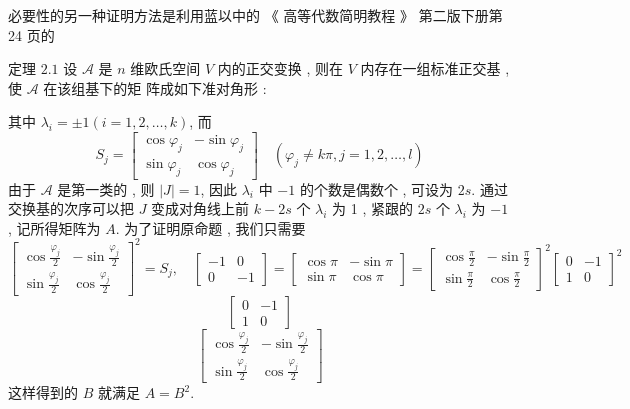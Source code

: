 \documentclass[10pt]{article}
\begin{document}
 必要性的另一种证明方法是利用蓝以中的 《 高等代数简明教程 》 第二版下册第  24  页的 

 定理  $2.1$  设  $\mathscr{A}$  是  $n$  维欧氏空间  $V$  内的正交变换 ,  则在  $V$  内存在一组标准正交基 ,  使  $\mathscr{A}$  在该组基下的矩   阵成如下准对角形 :


 其中  $\lambda_{i}=\pm 1(i=1,2, \ldots, k)$,  而 
$$
S_{j}=\left[\begin{array}{cc}
\cos \varphi_{j} & -\sin \varphi_{j} \\
\sin \varphi_{j} & \cos \varphi_{j}
\end{array}\right] \quad\left(\varphi_{j} \neq k \pi, j=1,2, \ldots, l\right)
$$
 由于  $\mathscr{A}$  是第一类的 ,  则  $|J|=1$,  因此  $\lambda_{i}$  中  $-1$  的个数是偶数个 ,  可设为  $2 s$.  通过交换基的次序可以把  $J$  变成对角线上前  $k-2 s$  个  $\lambda_{i}$  为  1 ,  紧跟的  $2 s$  个  $\lambda_{i}$  为  $-1$,  记所得矩阵为  $A$.  为了证明原命题 ,  我们只需要 
$$
\left[\begin{array}{cc}
\cos \frac{\varphi_{j}}{2} & -\sin \frac{\varphi_{j}}{2} \\
\sin \frac{\varphi_{j}}{2} & \cos \frac{\varphi_{j}}{2}
\end{array}\right]^{2}=S_{j}, \quad\left[\begin{array}{cc}
-1 & 0 \\
0 & -1
\end{array}\right]=\left[\begin{array}{cc}
\cos \pi & -\sin \pi \\
\sin \pi & \cos \pi
\end{array}\right]=\left[\begin{array}{cc}
\cos \frac{\pi}{2} & -\sin \frac{\pi}{2} \\
\sin \frac{\pi}{2} & \cos \frac{\pi}{2}
\end{array}\right]^{2}\left[\begin{array}{cc}
0 & -1 \\
1 & 0
\end{array}\right]^{2}
$$
$$
\left[\begin{array}{cc}
0 & -1 \\
1 & 0
\end{array}\right]
$$
$$
\left[\begin{array}{cc}
\cos \frac{\varphi_{j}}{2} & -\sin \frac{\varphi_{j}}{2} \\
\sin \frac{\varphi_{j}}{2} & \cos \frac{\varphi_{j}}{2}
\end{array}\right]
$$
 这样得到的  $B$  就满足  $A=B^{2}$.
\end{document}
